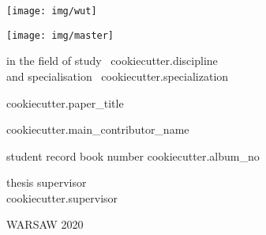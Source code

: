 \documentclass[12pt,twoside,a4paper]{article}
\newcommand{\discipline}{ {{ cookiecutter.discipline }} }
\renewcommand{\title}{ {{ cookiecutter.paper_title }} }
\renewcommand{\author}{ {{ cookiecutter.main_contributor_name }} }
\newcommand{\supervisor}{ {{ cookiecutter.supervisor }} }
\newcommand{\album}{ {{ cookiecutter.album_no }} }
\newcommand{\spec}{ {{ cookiecutter.specialization }} }
\renewcommand{\year}{2020}
\begin{document}
\pagestyle{empty}


\begin{center}
\texttt{[image: img/wut]}
\vspace{70pt}


\texttt{[image: img/master]} %

{ \arial
in the field of study~\discipline \\
and specialisation~\spec

\vspace{30pt}
{\arial \large \title}

\vspace{50pt}

{\arial \huge \author}

\vspace{5pt}

student record book number \album

\vspace{40pt}

thesis supervisor \\
{\arial \supervisor}

\vspace{15pt}


 \vfill
WARSAW \year \\
}
\end{center}


%
%
\end{document}
